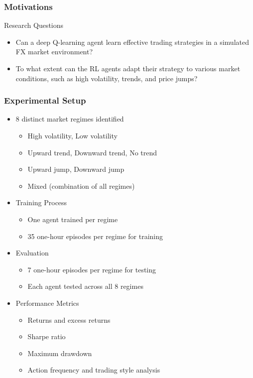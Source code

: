 \documentclass{beamer}
\begin{document}
\begin{frame}
  \frametitle{Motivations}

  \begin{block}
    {Research Questions}
    \begin{itemize}
      \item Can a deep Q-learning agent learn effective trading strategies in a simulated FX market environment?
      \item To what extent can the RL agents adapt their strategy to various market conditions, such as high volatility, trends, and price jumps?
    \end{itemize}
  \end{block}

\end{frame}

\begin{frame}
  \frametitle{Experimental Setup}

  \begin{itemize}
    \item 8 distinct market regimes identified
    \begin{itemize}
      \item High volatility, Low volatility
      \item Upward trend, Downward trend, No trend
      \item Upward jump, Downward jump
      \item Mixed (combination of all regimes)
    \end{itemize}
    \item Training Process
    \begin{itemize}
      \item One agent trained per regime
      \item 35 one-hour episodes per regime for training
    \end{itemize}
    \item Evaluation
    \begin{itemize}
      \item 7 one-hour episodes per regime for testing
      \item Each agent tested across all 8 regimes
    \end{itemize}
    \item Performance Metrics
    \begin{itemize}
      \item Returns and excess returns
      \item Sharpe ratio
      \item Maximum drawdown
      \item Action frequency and trading style analysis
    \end{itemize}
  \end{itemize}

\end{frame}
\end{document}
